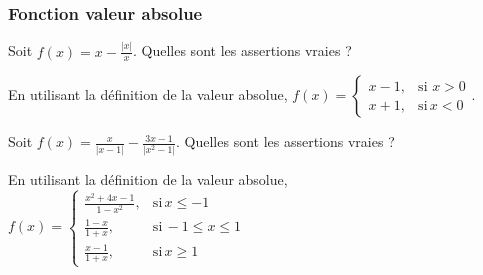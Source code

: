 \subsubsection{Fonction valeur absolue}


\begin{question}
 
Soit $f(x)= x-\frac{|x|}{x}$. Quelles sont les assertions vraies ?
\begin{answers}

    
    
    
    

   
\end{answers}
\begin{explanations}
En utilisant la définition de la  valeur absolue, $f(x)=\left\{\begin{array}{cc}x-1,& \mbox{si} \, \, x >0 \\ x+1,& \mbox{si} \,  x <0  \end{array}\right.$.
\end{explanations}

\end{question}


\begin{question}
 
Soit $f(x)= \frac{x}{|x-1|}-\frac{3x-1}{|x^2-1|}$. Quelles sont les assertions vraies ?
\begin{answers}

    
    
    
    


\end{answers}
\begin{explanations}
En utilisant la définition de la valeur absolue, 
 $f(x)=\left\{\begin{array}{ccc}\frac{x^2+4x-1}{1-x^2},& \mbox{si} \, x \le -1 \\ 
 \frac{1-x}{1+x} ,& \mbox{si} \,  -1\le x \le 1\\
   \frac{x-1}{1+x} ,& \mbox{si} \,  x \ge 1 \end{array}\right.$
\end{explanations}

\end{question}

